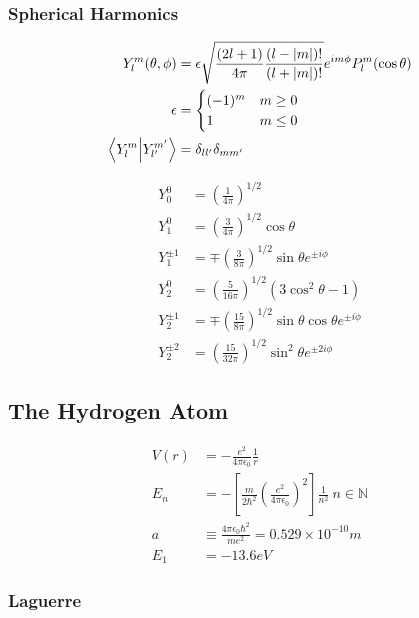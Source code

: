 \documentclass[8pt]{amsart}
\newcommand{\N}{\mathbb{N}}
\begin{document}
\begin{multicols}{3}
\subsubsection{Spherical Harmonics}%
\label{ssub:spherical_harmonics}

\begin{align*}
  Y_l^m(\theta,\phi)&=\epsilon\sqrt{\frac{(2l+1)}{4\pi}\frac{(l-|m|)!}{(l+|m|)!}}e^{im\phi}P_l^m(\cos\theta)\\
  \epsilon&=\begin{cases}
    (-1)^m & m\geq 0\\
    1 & m \leq 0
  \end{cases}\\
    \braket{Y_l^m}{Y_{l'}^{m'}}&=\delta_{ll'}\delta_{mm'}
\end{align*}

\begin{align*}
  Y_0^0&=\left(\frac{1}{4\pi}\right)^{1/2}\\
  Y_1^0&=\left(\frac{3}{4\pi}\right)^{1/2}\cos\theta\\
  Y_1^{\pm1}&=\mp\left(\frac{3}{8\pi}\right)^{1/2}\sin\theta e^{\pm i\phi}\\
  Y_2^0&=\left(\frac{5}{16\pi}\right)^{1/2}(3\cos^2\theta-1)\\
  Y_2^{\pm 1}&=\mp\left(\frac{15}{8\pi}\right)^{1/2}\sin\theta\cos\theta e^{\pm i\phi}\\
  Y_2^{\pm 2}&=\left(\frac{15}{32\pi}\right)^{1/2}\sin^2\theta e^{\pm 2i\phi}
\end{align*}

\subsection{The Hydrogen Atom}%
\label{sub:the_hydrogen_atom}
\begin{align*}
  V(r)&=-\frac{e^2}{4\pi\epsilon_0}\frac{1}{r}\\
  E_n&=-\left[\frac{m}{2\hbar^2}\left(\frac{e^2}{4\pi\epsilon_0}\right)^2\right]\frac{1}{n^2}\ n\in\N\\
  a&\equiv \frac{4\pi\epsilon_0\hbar^2}{me^2}=0.529\times10^{-10}m\\
  E_1&=-13.6eV
\end{align*}

\subsubsection{Laguerre}%
\label{ssub:laguerre}


\end{multicols}
\end{document}
